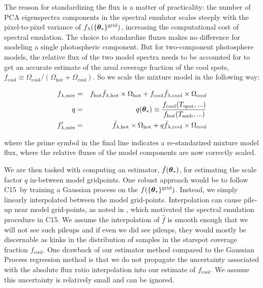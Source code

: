 \documentclass[twocolumn]{emulateapj}%
\newcommand{\iancze}{{\sc C15}}
\begin{document}
The reason for standardizing the flux is a matter of practicality: the number of PCA eigenspectra components in the spectral emulator scales steeply with the pixel-to-pixel variance of $f_{\lambda}(\{{\bm \theta}_{\ast}\}^\textrm{grid})$, increasing the computational cost of spectral emulation.  The choice to standardize fluxes makes no difference for modeling a single photospheric component.  But for two-component photosphere models, the relative flux of the two model spectra needs to be accounted for to get an accurate estimate of the areal coverage fraction of the cool spots, $f_{\mathrm{cool}} \equiv \Omega_{\mathrm{cool}}/(\Omega_{\mathrm{hot}}+\Omega_{\mathrm{cool}})$.  So we scale the mixture model in the following way:

\begin{eqnarray} \label{eqn:norm_scaling}
f_{\lambda, \mathrm{mix}} &=& f_{\mathrm{hot}} \bar f_{\lambda, \mathrm{hot}} \times \Omega_{\mathrm{hot}} + f_{\mathrm{cool}} \bar f_{\lambda, \mathrm{cool}} \times \Omega_{\mathrm{cool}} \\
q &=& q({\bm \theta}_{\ast})\equiv \frac{f_{\mathrm{cool}}(T_\textrm{spot}, ...)}{f_{\mathrm{hot}}(T_\textrm{amb}, ...)} \\
f_{\lambda, \mathrm{mix}}^{\prime} &=& \bar f_{\lambda, \mathrm{hot}} \times \Omega_{\mathrm{hot}} + q \bar f_{\lambda, \mathrm{cool}} \times \Omega_{\mathrm{cool}}
\end{eqnarray}

where the prime symbol in the final line indicates a re-standarized mixture model flux, where the relative fluxes of the model components are now correctly scaled.

We are then tasked with computing an estimator, $\hat f({\bm \theta}_{\ast})$, for estimating the scale factor $q$ in-between model gridpoints.  One robust approach would be to follow \iancze\ by training a Gaussian process on the $f(\{{\bm \theta}_{\ast}\}^\textrm{grid})$.  Instead, we simply linearly interpolated between the model grid-points.  Interpolation can cause pile-up near model grid-points, as noted in \citet{cottaar14}, which motivated the spectral emulation procedure in \iancze.  We assume the interpolation of $\hat f$ is smooth enough that we will not see such pileups and if even we did see pileups, they would mostly be discernable as kinks in the distribution of samples in the starspot coverage fraction $f_{\mathrm{cool}}$.  One drawback of our estimator method compared to the Gaussian Process regression method is that we do not propagate the uncertainty associated with the absolute flux ratio interpolation into our estimate of $f_{\mathrm{cool}}$.  We assume this uncertainty is relatively small and can be ignored.
\end{document}
